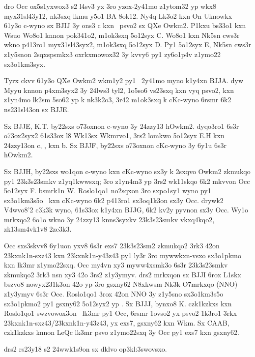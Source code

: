 dro Occ ox5s1yxwox3 s2 l4sv3 yx 3ro yzox-2y41mo z1ytom32 yp
wkx8 myx31sl43y12, nk3sxq lkmu y5o1 BA 8ok12.
Ny4q Lk3o2 kxn On Uknowkx 61y3o c-wyno sx BJIJ 3y ons3 c kxn \
psvo2 sx QXe Owkm2.  P1kxu bs33o1 kxn Wsuo Wo8o1 knnon pok341o2,
m1ok3sxq 5o12syx C.  Wo8o1 kxn Nk5sn cws3r wkno p413ro1 myx31sl43syx2,
m1ok3sxq 5o12syx D.  Py1 5o12syx E, Nk5sn cws3r z1y5snon 2sqxspsmkx3
oxrkxmowox32 3y kvvy6 py1 zy6o1p4v z1ymo22 sx3o1km3syx.

Tyrx ckvv 61y3o QXe Owkm2 wkm1y2 py1 \cKc\ 2y41mo myno k1y4xn BJJA.
dyw Myyu knnon p4xm3syx2 3y 24lws3 tyl2, 1o5so6 vs23sxq kxn vyq psvo2,
kxn z1yn4mo lk2sm 5so62 yp k nk3k2o3, 3r42 m1ok3sxq k cKc-wyno 6rsmr 6k2
ns231sl43on sx BJJE.

Sx BJJE, K.T. by22sxs o73oxnon c-wyno 3y 24zzy13 hOwkm2.  dyqo3ro1
6s3r o73ox2syx2 61s33ox l8 Wk13sx W{\"k}mrvo1, 3rs2 lomkwo 5o12syx
E.H kxn 24zzy13on c, \czv42, kxn b.
Sx BJJF, by22sxs o73oxnon cKc-wyno 3y 6y1u 6s3r hOwkm2.

Sx BJJH, by22sxs wo1qon c-wyno kxn cKc-wyno sx3y k 2sxqvo Owkm2
zkmukqo py1 23k3s23smkv z1yq1kwwsxq; 3ro z1yn4m3 yp 3rs2 wk11skqo 6k2
mkvvon Occ 5o12syx F.  bsmrk1n W. Roslo1qo1 no2sqxon 3ro sxpo1sy1 wyno
py1 sx3o1km3s5o \cKc\ kxn cKc-wyno 6k2 p413ro1 sx3oq1k3on sx3y Occ.
drywk2 V4wvo8'2 c3k3k wyno, 61s33ox k1y4xn BJJG, 6k2 kv2y pyvnon sx3y
Occ.  Wy1o mrkxqo2 6o1o wkno 3y 24zzy13 knns3syxkv 23k3s23smkv
vkxq4kqo2, zk13sm4vk1v8 \hVs2zc3k3.

Occ sxs3skvv8 6y1uon yxv8 6s3r exs7 23k3s23sm2 zkmukqo2 3rk3 42on
23kxnk1n-sxz43 kxn 23kxnk1n-y43z43 py1 ly3r 3ro mywwkxn-vsxo sx3o1pkmo
kxn lk3mr z1ymo22sxq.  Occ my4vn xy3 myww4xsmk3o 6s3r 23k3s23smkv
zkmukqo2 3rk3 nsn xy3 42o 3rs2 z1y3ymyv.  drs2 mrkxqon sx BJJI 6rox
L1skx bszvo8 nowyx231k3on 42o yp 3ro gsxny62 N8xkwsm Nk3k O7mrkxqo
(NNO) z1y3ymyv 6s3r Occ.  Roslo1qo1 3rox 42on NNO 3y z1y5sno
sx3o1km3s5o sx3o1pkmo2 py1 gsxny62 5o12syx2 yp .  Sx BJJJ,
bynxo8 K. czk1kzkxs kxn Roslo1qo1 swzvowox3on \cKc\ lk3mr py1 Occ, 6rsmr
1ovso2 yx psvo2 1k3ro1 3rkx 23kxnk1n-sxz43/23kxnk1n-y43z43, yx exs7,
gsxny62 kxn Wkm.  Sx CAAB, czk1kzkxs knnon LeQc lk3mr psvo z1ymo22sxq
3y Occ py1 exs7 kxn gsxny62.

drs2 rs23y18 s2 24wwk1s9on sx dklvo \1op{3kl:3swovsxo}.

